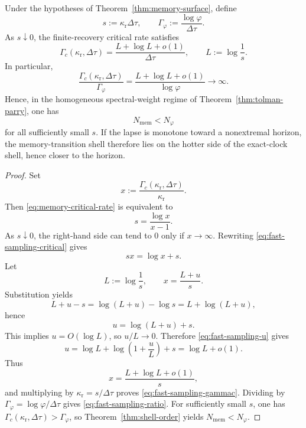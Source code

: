 \begin{theorem}\label{thm:fast-sampling-shell-separation}
Under the hypotheses of Theorem~\ref{thm:memory-surface}, define
\[
s:=\kappa_{\mathrm r}\Delta\tau,
\qquad
\Gamma_\varphi:=\frac{\log\varphi}{\Delta\tau}.
\]
As $s\downarrow 0$, the finite-recovery critical rate satisfies
\begin{equation}\label{eq:fast-sampling-gammac}
\Gamma_c(\kappa_{\mathrm r},\Delta\tau)
=
\frac{L+\log L+o(1)}{\Delta\tau},
\qquad
L:=\log\frac{1}{s}.
\end{equation}
In particular,
\begin{equation}\label{eq:fast-sampling-ratio}
\frac{\Gamma_c(\kappa_{\mathrm r},\Delta\tau)}{\Gamma_\varphi}
=
\frac{L+\log L+o(1)}{\log\varphi}
\longrightarrow \infty.
\end{equation}
Hence, in the homogeneous spectral-weight regime of Theorem~\ref{thm:tolman-parry}, one has
\begin{equation}\label{eq:fast-sampling-hotter}
N_{\mathrm{mem}}<N_\varphi
\end{equation}
for all sufficiently small $s$. If the lapse is monotone toward a nonextremal horizon, the memory-transition shell therefore lies on the hotter side of the exact-clock shell, hence closer to the horizon.
\end{theorem}

\begin{proof}
Set
\[
x:=\frac{\Gamma_c(\kappa_{\mathrm r},\Delta\tau)}{\kappa_{\mathrm r}}.
\]
Then \eqref{eq:memory-critical-rate} is equivalent to
\begin{equation}\label{eq:fast-sampling-critical}
s=\frac{\log x}{x-1}.
\end{equation}
As $s\downarrow 0$, the right-hand side can tend to $0$ only if $x\to\infty$. Rewriting \eqref{eq:fast-sampling-critical} gives
\[
sx=\log x+s.
\]
Let
\[
L:=\log\frac{1}{s},
\qquad
x=\frac{L+u}{s}.
\]
Substitution yields
\[
L+u-s
=
\log(L+u)-\log s
=
L+\log(L+u),
\]
hence
\begin{equation}\label{eq:fast-sampling-u}
u=\log(L+u)+s.
\end{equation}
This implies $u=O(\log L)$, so $u/L\to 0$. Therefore \eqref{eq:fast-sampling-u} gives
\[
u=\log L+\log\!\left(1+\frac{u}{L}\right)+s=\log L+o(1).
\]
Thus
\[
x=\frac{L+\log L+o(1)}{s},
\]
and multiplying by $\kappa_{\mathrm r}=s/\Delta\tau$ proves \eqref{eq:fast-sampling-gammac}. Dividing by $\Gamma_\varphi=\log\varphi/\Delta\tau$ gives \eqref{eq:fast-sampling-ratio}. For sufficiently small $s$, one has $\Gamma_c(\kappa_{\mathrm r},\Delta\tau)>\Gamma_\varphi$, so Theorem~\ref{thm:shell-order} yields $N_{\mathrm{mem}}<N_\varphi$.
\end{proof}

